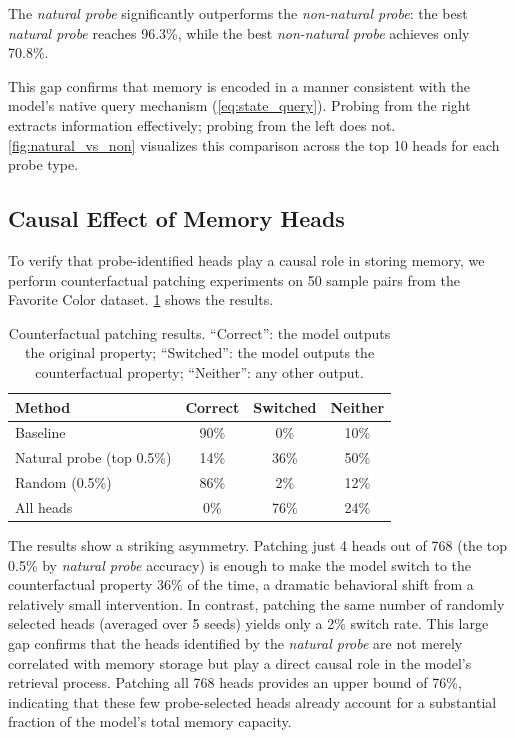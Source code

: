 \documentclass[11pt]{article}
\begin{document}
The \textit{natural probe} significantly outperforms the \textit{non-natural probe}: the best \textit{natural probe} reaches 96.3\%, while the best \textit{non-natural probe} achieves only 70.8\%.

This gap confirms that memory is encoded in a manner consistent with the model's native query mechanism (\cref{eq:state_query}). Probing from the right extracts information effectively; probing from the left does not. \cref{fig:natural_vs_non} visualizes this comparison across the top 10 heads for each probe type.


\subsection{Causal Effect of Memory Heads}
\label{sec:causal_results}

To verify that probe-identified heads play a causal role in storing memory, we perform counterfactual patching experiments on 50 sample pairs from the Favorite Color dataset. \cref{tab:causal} shows the results.

\begin{table}[t]
\centering
\small
\caption{Counterfactual patching results. ``Correct'': the model outputs the original property; ``Switched'': the model outputs the counterfactual property; ``Neither'': any other output.}
\label{tab:causal}
\begin{tabular}{@{}lccc@{}}
\toprule
Method & Correct & Switched & Neither \\
\midrule
Baseline & 90\% & 0\% & 10\% \\
Natural probe (top 0.5\%) & 14\% & 36\% & 50\% \\
Random (0.5\%) & 86\% & 2\% & 12\% \\
All heads & 0\% & 76\% & 24\% \\
\bottomrule
\end{tabular}
\end{table}

The results show a striking asymmetry. Patching just 4 heads out of 768 (the top 0.5\% by \textit{natural probe} accuracy) is enough to make the model switch to the counterfactual property 36\% of the time, a dramatic behavioral shift from a relatively small intervention. In contrast, patching the same number of randomly selected heads (averaged over 5 seeds) yields only a 2\% switch rate. This large gap confirms that the heads identified by the \textit{natural probe} are not merely correlated with memory storage but play a direct causal role in the model's retrieval process. Patching all 768 heads provides an upper bound of 76\%, indicating that these few probe-selected heads already account for a substantial fraction of the model's total memory capacity.
\end{document}
